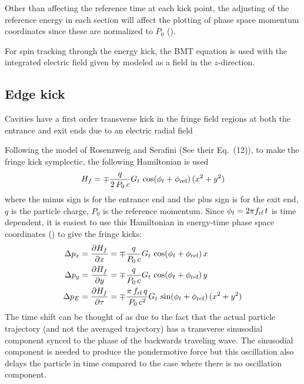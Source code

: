 Other than affecting the reference time at each kick point, the adjusting of the reference energy
in each section will affect the plotting of phase space momentum coordinates since these
are normalized to $P_0$ ().

For spin tracking through the energy kick, the BMT equation is used with the integrated electric field
given by  modeled as a field in the $z$-direction.

\subsection{Edge kick}

Cavities have a first order transverse kick in the fringe field regions at both the entrance and
exit ends due to an electric radial field 

Following the model of Rosenzweig and Serafini\cite{b:rosenzweig} (See their Eq.~(12)),
to make the fringe kick symplectic, the following Hamiltonian is used
\begin{equation}
  H_f = \mp \frac{q}{2 \, P_0 \, c} G_t \, \cos(\phi_t + \phi_{\text{ref}}) \, (x^2 + y^2)
\end{equation}
where the minus sign is for the entrance end and the plus sign is for the exit end, $q$ is the
particle charge, $P_0$ is the reference momentum. Since $\phi_t = 2 \pi f_{\text{rf}} \, t$ is time
dependent, it is easiest to use this Hamiltonian in energy-time phase space coordinates
() to give the fringe kicks:
\begin{align}
  \Delta p_x &= \frac{\partial H_f}{\partial x} 
              = \mp \frac{q}{P_0 \, c} G_t \, \cos(\phi_t + \phi_{\text{ref}}) \, x \nonumber \\
  \Delta p_y &= \frac{\partial H_f}{\partial y} 
              = \mp\frac{q}{P_0 \, c} G_t \, \cos(\phi_t + \phi_{\text{ref}}) \, y \\
  \Delta p_E &= \frac{\partial H_f}{\partial \tau} 
                 = \mp \frac{\pi \, f_{\text{rf}} \, q}{P_0 \, c^2} G_t \, \sin(\phi_t + \phi_{\text{ref}}) \, (x^2 + y^2)
      \nonumber
\end{align}
The time shift can be thought of as due to the fact that the actual particle trajectory (and not the
averaged trajectory) has a transverse sinusodial component synced to the phase of the backwards
traveling wave.  The sinusodial component is needed to produce the pondermotive force but this
oscillation also delays the particle in time compared to the case where there is no oscillation
component.

